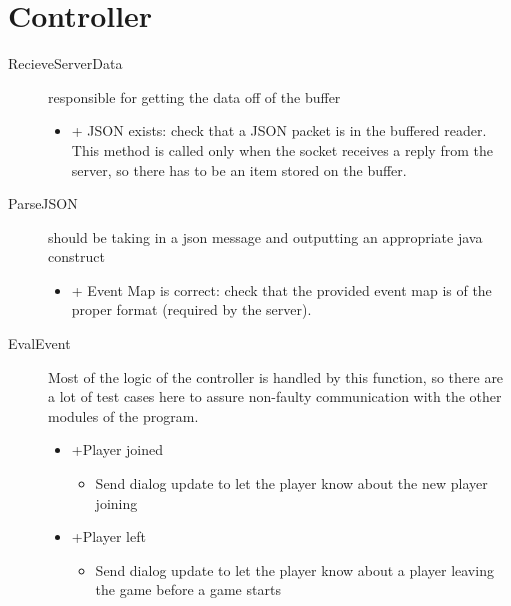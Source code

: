 \section{Controller}
\begin{description}
	\item[RecieveServerData] responsible for getting the data off of the buffer
	\begin{itemize}
		\item + JSON exists: check that a JSON packet is in the buffered reader. This method is called only when the socket receives a reply from the server, so there has to be an item stored on the buffer.
	\end{itemize}
	\item[ParseJSON] should be taking in a json message and outputting an appropriate java construct
	\begin{itemize}
		\item + Event Map is correct: check that the provided event map is of the proper format (required by the server). 
	\end{itemize}
	
	\item[EvalEvent] Most of the logic of the controller is handled by this function, so there are a lot of test cases here to assure non-faulty communication with the other modules of the program. 
	\begin{itemize}
    \item +Player joined
    \begin{itemize}
    \item Send dialog update to let the player know about the new player joining
    \end{itemize}

		                
		\item +Player left
		\begin{itemize}
		    \item Send dialog update to let the player know about a player leaving the game before a game starts
		\end{itemize}
		                

\end{itemize}
\end{description}
